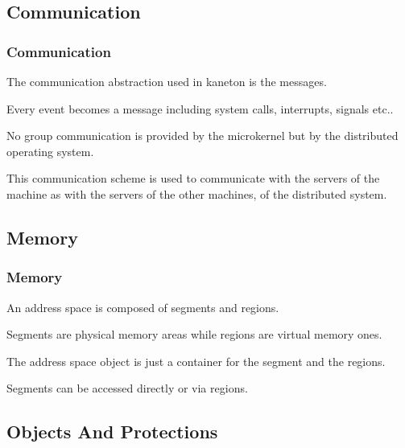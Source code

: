%
%

\subsection{Communication}


\begin{frame}
  \frametitle{Communication}

  The communication abstraction used in kaneton is the messages.

  \nl

  Every event becomes a message including system calls, interrupts,
  signals etc..

  \nl

  No group communication is provided by the microkernel but by the distributed
  operating system.

  \nl

  This communication scheme is used to communicate with the servers
  of the machine as with the servers of the other machines, of
  the distributed system.
\end{frame}

%
%

\subsection{Memory}


\begin{frame}
  \frametitle{Memory}

  An address space is composed of segments and regions.

  \nl

  Segments are physical memory areas while regions are virtual memory
  ones.

  \nl

  The address space object is just a container for the segment and
  the regions.

  \nl

  Segments can be accessed directly or via regions.
\end{frame}

%
%

\subsection{Objects And Protections}


